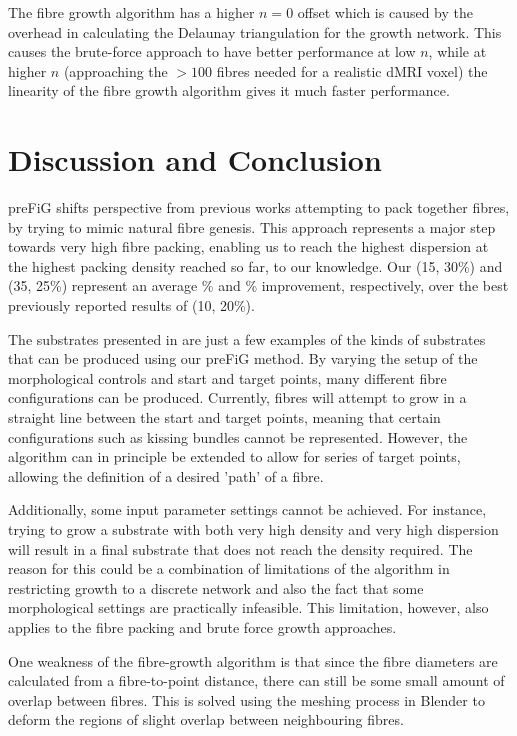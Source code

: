 The fibre growth algorithm has a higher $n=0$ offset which is caused by the overhead in calculating the Delaunay triangulation for the growth network.
This causes the brute-force approach to have better performance at low $n$, while at higher $n$ (approaching the $>100$ fibres needed for a realistic dMRI voxel) the linearity of the fibre growth algorithm gives it much faster performance.



\section{Discussion and Conclusion}
\label{sec:ipmi_discussion}
\ac{preFiG} shifts perspective from previous works attempting to pack together fibres, by trying to mimic natural fibre genesis.
This approach represents a major step towards very high fibre packing, enabling us to reach the highest dispersion at the highest packing density reached so far, to our knowledge. Our (15\degree, 30\%) and (35\degree, 25\%) represent an average \% and \% improvement, respectively, over the best previously reported results of (10\degree, 20\%)\cite{Ginsburger2018}.


The substrates presented in  are just a few examples of the kinds of substrates that can be produced using our \ac{preFiG} method.
By varying the setup of the morphological controls and start and target points, many different fibre configurations can be produced.
Currently, fibres will attempt to grow in a straight line between the start and target points, meaning that certain configurations such as kissing bundles cannot be represented.
However, the algorithm can in principle be extended to allow for series of target points, allowing the definition of a desired 'path' of a fibre.

Additionally, some input parameter settings cannot be achieved.
For instance, trying to grow a substrate with both very high density and very high dispersion will result in a final substrate that does not reach the density required.
The reason for this could be a combination of limitations of the algorithm in restricting growth to a discrete network and also the fact that some morphological settings are practically infeasible.
This limitation, however, also applies to the fibre packing and  brute force growth approaches.

One weakness of the fibre-growth algorithm is that since the fibre diameters are calculated from a fibre-to-point distance, there can still be some small amount of overlap between fibres.
This is solved using the meshing process in Blender to deform the regions of slight overlap between neighbouring fibres.

